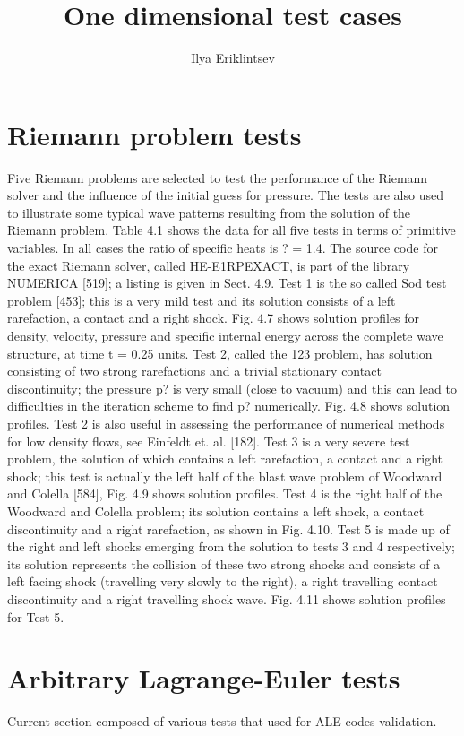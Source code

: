 \documentclass[10pt,a4paper]{article}
\author{Ilya Eriklintsev}
\title{One dimensional test cases}
\begin{document}
\section{Riemann problem tests}
Five Riemann problems are selected to test the performance of the Riemann
solver and the influence of the initial guess for pressure. The tests are
also used to illustrate some typical wave patterns resulting from the solution
of the Riemann problem. Table 4.1 shows the data for all five tests in terms
of primitive variables. In all cases the ratio of specific heats is ? = 1.4. The
source code for the exact Riemann solver, called HE-E1RPEXACT, is part of
the library NUMERICA [519]; a listing is given in Sect. 4.9.
Test 1 is the so called Sod test problem [453]; this is a very mild test and
its solution consists of a left rarefaction, a contact and a right shock. Fig.
4.7 shows solution profiles for density, velocity, pressure and specific internal
energy across the complete wave structure, at time t = 0.25 units. Test 2,
called the 123 problem, has solution consisting of two strong rarefactions and
a trivial stationary contact discontinuity; the pressure p? is very small (close
to vacuum) and this can lead to difficulties in the iteration scheme to find p?
numerically. Fig. 4.8 shows solution profiles. Test 2 is also useful in assessing
the performance of numerical methods for low density flows, see Einfeldt et.
al. [182]. Test 3 is a very severe test problem, the solution of which contains a
left rarefaction, a contact and a right shock; this test is actually the left half
of the blast wave problem of Woodward and Colella [584], Fig. 4.9 shows solution
profiles. Test 4 is the right half of the Woodward and Colella problem; its
solution contains a left shock, a contact discontinuity and a right rarefaction,
as shown in Fig. 4.10. Test 5 is made up of the right and left shocks emerging
from the solution to tests 3 and 4 respectively; its solution represents the collision
of these two strong shocks and consists of a left facing shock (travelling
very slowly to the right), a right travelling contact discontinuity and a right
travelling shock wave. Fig. 4.11 shows solution profiles for Test 5.
\section{Arbitrary Lagrange-Euler tests}
Current section composed of various tests that used for ALE codes validation.

\medskip
 
\printbibliography
\end{document}

